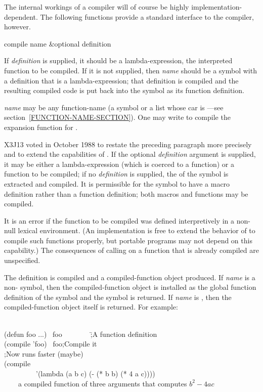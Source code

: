 The internal workings of a compiler will of course be highly
implementation-dependent.  The following functions provide a standard
interface to the compiler, however.


\begin{defun}[Function]
compile name &optional definition

\begin{obsolete}\noindent
If \emph{definition} is supplied, it should be a lambda-expression,
the interpreted function to be compiled.  If it is not supplied,
then \emph{name} should be a symbol with a definition that is a
lambda-expression; that definition is compiled
and the resulting compiled code is put back into the symbol
as its function definition.
\end{obsolete}

\emph{name} may be any function-name (a symbol or a list
whose car is ---see section~\ref{FUNCTION-NAME-SECTION}).
One may write  to compile the 
expansion function for .

\begin{newer}
X3J13 voted in October 1988 
to restate the preceding paragraph more precisely and to extend the
capabilities of .
If the optional \emph{definition} argument is supplied,
it may be either a lambda-expression (which is coerced to a function)
or a function to be compiled; if no \emph{definition} is supplied,
the  of the symbol is extracted and compiled.
It is permissible for the symbol to have a macro definition rather than
a function definition; both macros and functions may be compiled.

It is an error if the function to be compiled was defined interpretively
in a non-null lexical environment.  (An implementation is free to extend
the behavior of  to compile such functions properly, but
portable programs may not depend on this capability.)  The consequences
of calling  on a function that is already compiled
are unspecified.
\end{newer}

\begin{obsolete}
The definition is compiled and a compiled-function object produced.
If \emph{name} is a non-{\nil}
symbol, then the compiled-function object is installed as the
global function definition of the symbol and the symbol is returned.
If \emph{name} is {\false}, then the compiled-function object itself is returned.
For example:
\begin{lisp}
\\
(defun foo ...) \EV\ foo~~~~~~~~\=;\textrm{A function definition} \\
(compile 'foo) \EV\ foo\>;\textrm{Compile it} \\
\>;\textrm{Now  runs faster (maybe)} \\[4pt]
(compile {\false} \\
~~~~~~~~~'(lambda (a b c) (- (* b b) (* 4 a c)))) \\
~~~\EV\ \textrm{a compiled function of three arguments that computes $b^2-4ac$}
\end{lisp}
\end{obsolete}


\end{defun}
